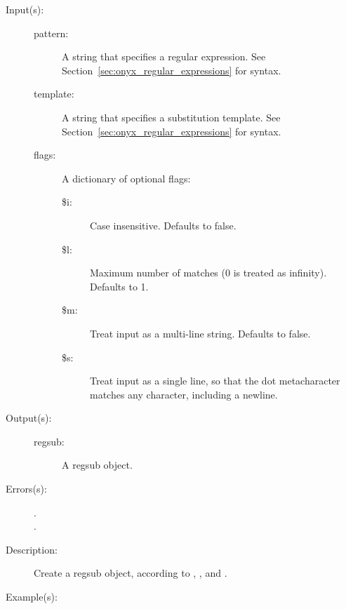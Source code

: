 \begin{description}
\begin{description}
\begin{verbatim}
		\end{verbatim}
	\end{description}
\label{systemdict:regsub}
\item[{\onyxop{pattern template flags}{regsub}{regsub}}: ]
\item[{\onyxop{pattern template}{regsub}{regsub}}: ]
	\begin{description}\item[]
	\item[Input(s): ]
		\begin{description}\item[]
		\item[pattern: ]
			A string that specifies a regular expression.  See
			Section~\ref{sec:onyx_regular_expressions} for syntax.
		\item[template: ]
			A string that specifies a substitution template.  See
			Section~\ref{sec:onyx_regular_expressions} for syntax.
		\item[flags: ]
			A dictionary of optional flags:
			\begin{description}%
			\item[\$i: ] Case insensitive.  Defaults to false.
			\item[\$l: ] Maximum number of matches (0 is treated as
				infinity).  Defaults to 1.
			\item[\$m: ] Treat input as a multi-line string.
				Defaults to false.
			\item[\$s: ] Treat input as a single line, so that
				the dot metacharacter matches any character,
				including a newline.
			\end{description}
		\end{description}
	\item[Output(s): ]
		\begin{description}\item[]
		\item[regsub: ]
			A regsub object.
		\end{description}
	\item[Errors(s): ]
		\begin{description}\item[]
		\item[.]
		\item[.]
		\end{description}
	\item[Description: ]
		Create a regsub object, according to ,
		, and .
	\item[Example(s): ]\begin{verbatim}


\end{verbatim}
\end{description}
\end{description}
